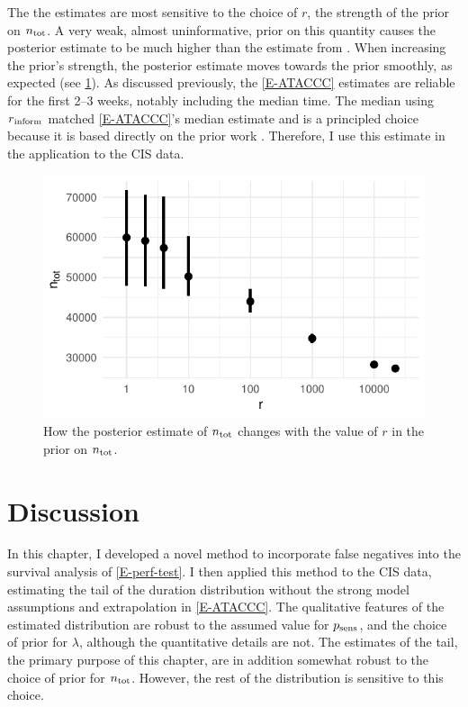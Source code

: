 \documentclass[thesis.tex]{subfiles}
\begin{document}
The the estimates are most sensitive to the choice of $r$, the strength of the prior on $n_\text{tot}$.
A very weak, almost uninformative, prior on this quantity causes the posterior estimate to be much higher than the estimate from \textcite{birrellRTM2}.
When increasing the prior's strength, the posterior estimate moves towards the prior smoothly, as expected (see \cref{imperf-test:fig:ntot}).
As discussed previously, the \cref{E-ATACCC} estimates are reliable for the first 2--3 weeks, notably including the median time.
The median using $r{_{\text{inform}}}$ matched \cref{E-ATACCC}'s median estimate and is a principled choice because it is based directly on the prior work \textcite{birrellRTM2}.
Therefore, I use this estimate in the application to the CIS data.
\begin{figure}
  \centering \includegraphics{cis-imperfect-testing/CIS_ntot}
  \caption{How the posterior estimate of $n_\text{tot}$ changes with the value of $r$ in the prior on $n_\text{tot}$.}
  \label{imperf-test:fig:ntot}
\end{figure}

\section{Discussion} \label{imperf-test:sec:discussion}

In this chapter, I developed a novel method to incorporate false negatives into the survival analysis of \cref{E-perf-test}.
I then applied this method to the CIS data, estimating the tail of the duration distribution without the strong model assumptions and extrapolation in \cref{E-ATACCC}.
The qualitative features of the estimated distribution are robust to the assumed value for $p_\text{sens}$, and the choice of prior for $\lambda$, although the quantitative details are not.
The estimates of the tail, the primary purpose of this chapter, are in addition somewhat robust to the choice of prior for $n_\text{tot}$.
However, the rest of the distribution is sensitive to this choice.
\end{document}
